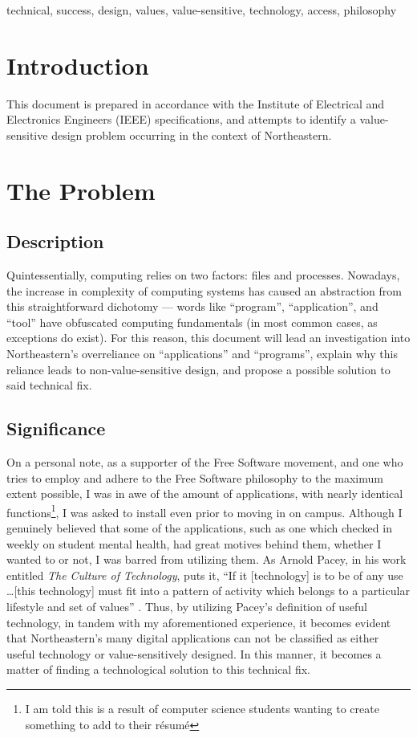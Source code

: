 \documentclass[conference]{IEEEtran}
\begin{document}
\begin{IEEEkeywords}
  technical, success, design, values, value-sensitive, technology, access, philosophy
\end{IEEEkeywords}

\section{Introduction}
This document is prepared in accordance with the Institute of Electrical and Electronics Engineers (IEEE) specifications, and attempts to identify a value-sensitive design problem occurring in the context of Northeastern.

\section{The Problem}

\subsection{Description}

Quintessentially, computing relies on two factors: files and processes. Nowadays, the increase in complexity of computing systems has caused an abstraction from this straightforward dichotomy — words like ``program'', ``application'', and  ``tool'' have obfuscated computing fundamentals (in most common cases, as exceptions do exist). For this reason, this document will lead an investigation into Northeastern's overreliance on ``applications'' and ``programs'', explain why this reliance leads to non-value-sensitive design, and propose a possible solution to said technical fix. 

\subsection{Significance}

On a personal note, as a supporter of the Free Software movement, and one who tries to employ and adhere to the Free Software philosophy to the maximum extent possible, I was in awe of the amount of applications, with nearly identical functions\footnote{I am told this is a result of computer science students wanting to create something to add to their r\'esum\'e}, I was asked to install even prior to moving in on campus. Although I genuinely believed that some of the applications, such as one which checked in weekly on student mental health, had great motives behind them, whether I wanted to or not, I was barred from utilizing them. As Arnold Pacey, in his work entitled \textit{The Culture of Technology}, puts it, ``If it [technology] is to be of any use \dots [this technology] must fit into a pattern of activity which belongs to a particular lifestyle and set of values'' \cite[pp. 3]{b1}. Thus, by utilizing Pacey's definition of useful technology, in tandem with my aforementioned experience, it becomes evident that Northeastern's many digital applications can not be classified as either useful technology or value-sensitively designed. In this manner, it becomes a matter of finding a technological solution to this technical fix.
\end{document}
